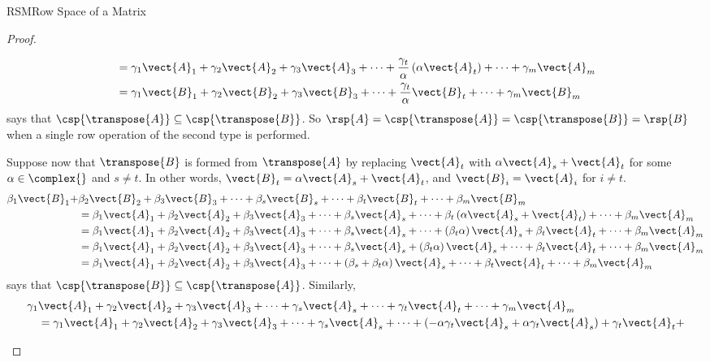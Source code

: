 \begin{subsect}{RSM}{Row Space of a Matrix}
\begin{proof}
\begin{para}
\begin{align*}
%
&=
\gamma_1\vect{A}_1+
\gamma_2\vect{A}_2+
\gamma_3\vect{A}_3+
\cdots+
\frac{\gamma_t}{\alpha}\left(\alpha\vect{A}_t\right)+
\cdots+
\gamma_m\vect{A}_m\\
%
&=
\gamma_1\vect{B}_1+
\gamma_2\vect{B}_2+
\gamma_3\vect{B}_3+
\cdots+
\frac{\gamma_t}{\alpha}\vect{B}_t+
\cdots+
\gamma_m\vect{B}_m
\end{align*}
%
says that $\csp{\transpose{A}}\subseteq\csp{\transpose{B}}$.   So $\rsp{A}=\csp{\transpose{A}}=\csp{\transpose{B}}=\rsp{B}$ when a single row operation of the second type is performed.\end{para}
%
\begin{para}Suppose now that $\transpose{B}$ is formed from $\transpose{A}$ by replacing $\vect{A}_t$ with $\alpha\vect{A}_s+\vect{A}_t$ for some $\alpha\in\complex{\null}$ and $s\neq t$.  In other words, $\vect{B}_t=\alpha\vect{A}_s+\vect{A}_t$, and $\vect{B}_i=\vect{A}_i$ for $i\neq t$.
\begin{align*}
\beta_1\vect{B}_1+
&
\beta_2\vect{B}_2+
\beta_3\vect{B}_3+
\cdots+
\beta_s\vect{B}_s+
\cdots+
\beta_t\vect{B}_t+
\cdots+
\beta_m\vect{B}_m\\
%
&=
\beta_1\vect{A}_1+
\beta_2\vect{A}_2+
\beta_3\vect{A}_3+
\cdots+
\beta_s\vect{A}_s+
\cdots+
\beta_t\left(\alpha\vect{A}_s+\vect{A}_t\right)+
\cdots+
\beta_m\vect{A}_m\\
%
&=
\beta_1\vect{A}_1+
\beta_2\vect{A}_2+
\beta_3\vect{A}_3+
\cdots+
\beta_s\vect{A}_s+
\cdots+
\left(\beta_t\alpha\right)\vect{A}_s+\beta_t\vect{A}_t+
\cdots+
\beta_m\vect{A}_m\\
%
&=
\beta_1\vect{A}_1+
\beta_2\vect{A}_2+
\beta_3\vect{A}_3+
\cdots+
\beta_s\vect{A}_s+\left(\beta_t\alpha\right)\vect{A}_s+
\cdots+
\beta_t\vect{A}_t+
\cdots+
\beta_m\vect{A}_m\\
%
&=
\beta_1\vect{A}_1+
\beta_2\vect{A}_2+
\beta_3\vect{A}_3+
\cdots+
\left(\beta_s+\beta_t\alpha\right)\vect{A}_s+
\cdots+
\beta_t\vect{A}_t+
\cdots+
\beta_m\vect{A}_m
\end{align*}
%
says that $\csp{\transpose{B}}\subseteq\csp{\transpose{A}}$.  Similarly,
%
%
\begin{align*}
\gamma_1&\vect{A}_1+
\gamma_2\vect{A}_2+
\gamma_3\vect{A}_3+
\cdots+
\gamma_s\vect{A}_s+
\cdots+
\gamma_t\vect{A}_t+
\cdots+
\gamma_m\vect{A}_m\\
%
&=
\gamma_1\vect{A}_1+
\gamma_2\vect{A}_2+
\gamma_3\vect{A}_3+
\cdots+
\gamma_s\vect{A}_s+
\cdots+
\left(-\alpha\gamma_t\vect{A}_s + \alpha\gamma_t\vect{A}_s\right)+\gamma_t\vect{A}_t+

\end{align*}
\end{para}
\end{proof}
\end{subsect}
